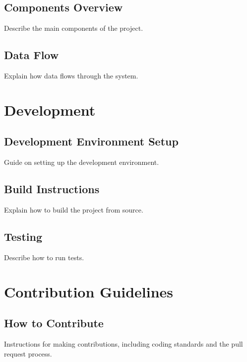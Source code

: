\documentclass[letterpaper,10pt,english]{sphinxmanual}
\begin{document}
\section{Components Overview}
\label{\detokenize{architecture:components-overview}}
\sphinxAtStartPar
Describe the main components of the project.


\section{Data Flow}
\label{\detokenize{architecture:data-flow}}
\sphinxAtStartPar
Explain how data flows through the system.

\sphinxstepscope


\chapter{Development}
\label{\detokenize{development:development}}\label{\detokenize{development::doc}}

\section{Development Environment Setup}
\label{\detokenize{development:development-environment-setup}}
\sphinxAtStartPar
Guide on setting up the development environment.


\section{Build Instructions}
\label{\detokenize{development:build-instructions}}
\sphinxAtStartPar
Explain how to build the project from source.


\section{Testing}
\label{\detokenize{development:testing}}
\sphinxAtStartPar
Describe how to run tests.

\sphinxstepscope


\chapter{Contribution Guidelines}
\label{\detokenize{contribution_guidelines:contribution-guidelines}}\label{\detokenize{contribution_guidelines::doc}}

\section{How to Contribute}
\label{\detokenize{contribution_guidelines:how-to-contribute}}
\sphinxAtStartPar
Instructions for making contributions, including coding standards and the pull request process.
\end{document}
